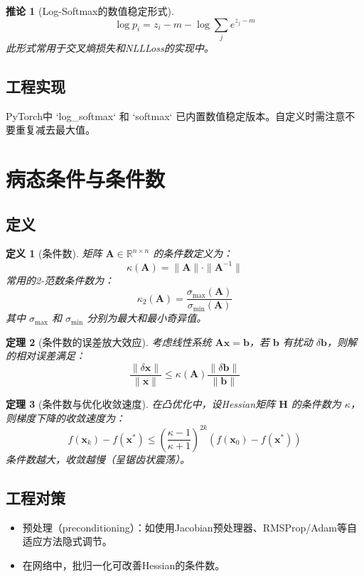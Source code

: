 \documentclass[UTF8, 10pt]{ctexart}
\newtheorem{theorem}{定理}[section]
\newtheorem{corollary}[theorem]{推论}
\newtheorem{definition}{定义}[section]
\newcommand{\R}{\mathbb{R}}
\begin{document}
\begin{corollary}[Log-Softmax的数值稳定形式]
\[
\log p_i = z_i - m - \log\sum_j e^{z_j - m}
\]
此形式常用于交叉熵损失和NLLLoss的实现中。
\end{corollary}

\subsection{工程实现}
PyTorch中 `log_softmax` 和 `softmax` 已内置数值稳定版本。自定义时需注意不要重复减去最大值。

\section{病态条件与条件数}
\subsection{定义}
\begin{definition}[条件数]
矩阵 $\bm{A} \in \R^{n \times n}$ 的条件数定义为：
\[
\kappa(\bm{A}) = \|\bm{A}\| \cdot \|\bm{A}^{-1}\|
\]
常用的2-范数条件数为：
\[
\kappa_2(\bm{A}) = \frac{\sigma_{\max}(\bm{A})}{\sigma_{\min}(\bm{A})}
\]
其中 $\sigma_{\max}$ 和 $\sigma_{\min}$ 分别为最大和最小奇异值。
\end{definition}

\begin{theorem}[条件数的误差放大效应]
考虑线性系统 $\bm{A}\bm{x} = \bm{b}$，若 $\bm{b}$ 有扰动 $\delta \bm{b}$，则解的相对误差满足：
\[
\frac{\|\delta \bm{x}\|}{\|\bm{x}\|} \le \kappa(\bm{A}) \frac{\|\delta \bm{b}\|}{\|\bm{b}\|}
\]
\end{theorem}

\begin{theorem}[条件数与优化收敛速度]
在凸优化中，设Hessian矩阵 $\bm{H}$ 的条件数为 $\kappa$，则梯度下降的收敛速度为：
\[
f(\bm{x}_k) - f(\bm{x}^*) \le \left(\frac{\kappa - 1}{\kappa + 1}\right)^{2k} (f(\bm{x}_0) - f(\bm{x}^*))
\]
条件数越大，收敛越慢（呈锯齿状震荡）。
\end{theorem}

\subsection{工程对策}
\begin{itemize}
    \item 预处理（preconditioning）：如使用Jacobian预处理器、RMSProp/Adam等自适应方法隐式调节。
    \item 在网络中，批归一化可改善Hessian的条件数。
\end{itemize}
\end{document}
